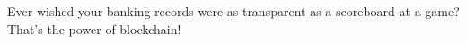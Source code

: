 \documentclass[preview]{standalone}
\begin{document}
\begin{center}
Ever wished your banking records were as transparent as a scoreboard at a game? That’s the power of blockchain!
\end{center}
\end{document}
